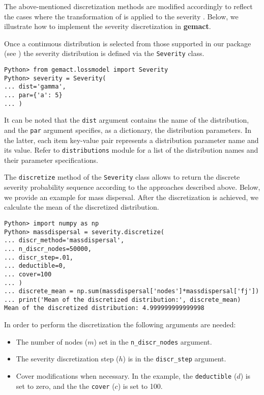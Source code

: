 \documentclass{article}
\begin{document}
The above-mentioned discretization methods are modified accordingly to reflect the cases where the transformation of  is applied to the severity \cite[p.~517]{klugman98}. Below, we illustrate how to implement the  severity discretization in \textbf{gemact}.

Once a continuous distribution is selected from those supported in our package (see ) the severity distribution is defined via the \texttt{Severity} class. 

\begin{lstlisting}
Python> from gemact.lossmodel import Severity
Python> severity = Severity(
... dist='gamma',
... par={'a': 5}
... )
\end{lstlisting}

It can be noted that the \texttt{dist} argument contains the name of the distribution, and 
the \texttt{par} argument specifies, as a dictionary, the distribution parameters. In the latter, each item key-value pair represents a distribution parameter name and its value. Refer to \texttt{distributions} module for a list of the distribution names and their parameter specifications.

The \texttt{discretize} method of the \texttt{Severity} class allows to return the discrete severity probability sequence according to the approaches described above. Below, we provide an example for mass dispersal. After the discretization is achieved, we calculate the mean of the discretized distribution.

\begin{lstlisting}
Python> import numpy as np
Python> massdispersal = severity.discretize(
... discr_method='massdispersal',
... n_discr_nodes=50000,
... discr_step=.01,
... deductible=0,
... cover=100
... )
... discrete_mean = np.sum(massdispersal['nodes']*massdispersal['fj'])
... print('Mean of the discretized distribution:', discrete_mean)
Mean of the discretized distribution: 4.999999999999998
\end{lstlisting}

In order to perform the discretization the following arguments are needed: 

\begin{itemize}
    \item The number of nodes ($m$) set in the \texttt{n\_discr\_nodes} argument. 
    \item The severity discretization step ($h$) is in the \texttt{discr\_step} argument. 
    \item Cover modifications when necessary. In the example, the \texttt{deductible} ($d$) is set to zero, and the the \texttt{cover} ($c$) is set to 100.
\end{itemize}
\end{document}
